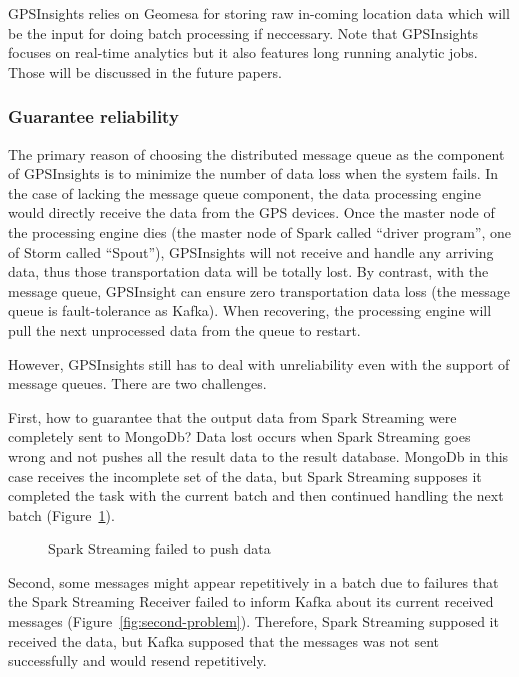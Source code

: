 \documentclass{acm_proc_article-sp}
\begin{document}
GPSInsights relies on Geomesa for storing raw in-coming location data which will be the input for doing batch processing if neccessary. Note that GPSInsights focuses on real-time analytics but it also features long running analytic jobs. Those will be discussed in the future papers. 

\subsubsection{Guarantee reliability}

The primary reason of choosing the distributed message queue as the component of GPSInsights is to minimize the number of data loss when the system fails. In the case of lacking the message queue component, the data processing engine would directly receive the data from the GPS devices. Once the master node of the processing engine dies (the master node of Spark called ``driver program'', one of Storm called ``Spout''), GPSInsights will not receive and handle any arriving data, thus those transportation data will be totally lost. By contrast, with the message queue, GPSInsight can ensure zero transportation data loss (the message queue is fault-tolerance as Kafka). When recovering, the processing engine will pull the next unprocessed data from the queue to restart.

However, GPSInsights still has to deal with unreliability even with the support of message queues. There are two challenges. 

First, how to guarantee that the output data from Spark Streaming were completely sent to MongoDb? Data lost occurs when Spark Streaming goes wrong and not pushes all the result data to the result database. MongoDb in this case receives the incomplete set of the data, but Spark Streaming supposes it completed the task with the current batch and then continued handling the next batch (Figure~\ref{fig:first-problem}).

\begin{figure}[h]
\centering
{}
\caption{Spark Streaming failed to push data}
\label{fig:first-problem}
\end{figure} 

Second, some messages might appear repetitively in a batch due to failures that the Spark Streaming Receiver failed to inform Kafka about its current received messages (Figure~\ref{fig:second-problem}). Therefore, Spark Streaming supposed it received the data, but Kafka supposed that the messages was not sent successfully and would resend repetitively. 
 
\end{document}
